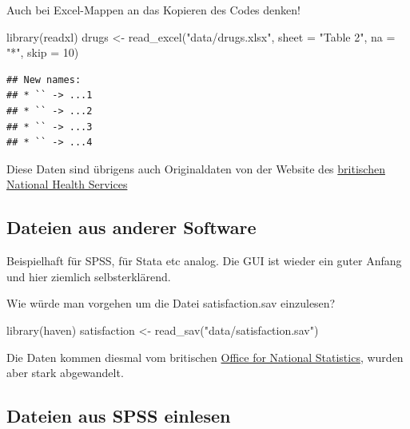 \documentclass[
]{book}
\newenvironment{Shaded}{\begin{snugshade}}{\end{snugshade}}
\newcommand{\AttributeTok}[1]{\textcolor[rgb]{0.77,0.63,0.00}{#1}}
\newcommand{\DecValTok}[1]{\textcolor[rgb]{0.00,0.00,0.81}{#1}}
\newcommand{\FunctionTok}[1]{\textcolor[rgb]{0.00,0.00,0.00}{#1}}
\newcommand{\NormalTok}[1]{#1}
\newcommand{\OtherTok}[1]{\textcolor[rgb]{0.56,0.35,0.01}{#1}}
\newcommand{\StringTok}[1]{\textcolor[rgb]{0.31,0.60,0.02}{#1}}
\begin{document}
Auch bei Excel-Mappen an das Kopieren des Codes denken!

\begin{Shaded}
\begin{Highlighting}[]
\FunctionTok{library}\NormalTok{(readxl)}
\NormalTok{drugs }\OtherTok{\textless{}{-}} \FunctionTok{read\_excel}\NormalTok{(}\StringTok{"data/drugs.xlsx"}\NormalTok{,}
                    \AttributeTok{sheet =} \StringTok{"Table 2"}\NormalTok{, }\AttributeTok{na =} \StringTok{"*"}\NormalTok{, }\AttributeTok{skip =} \DecValTok{10}\NormalTok{)}
\end{Highlighting}
\end{Shaded}

\begin{verbatim}
## New names:
## * `` -> ...1
## * `` -> ...2
## * `` -> ...3
## * `` -> ...4
\end{verbatim}

Diese Daten sind übrigens auch Originaldaten von der Website des \href{https://digital.nhs.uk/data-and-information/publications/statistical/statistics-on-drug-misuse/2018}{britischen National Health Services}

\hypertarget{dateien-aus-anderer-software}{%
\subsection{Dateien aus anderer Software}\label{dateien-aus-anderer-software}}

Beispielhaft für SPSS, für Stata etc analog.
Die GUI ist wieder ein guter Anfang und hier ziemlich selbsterklärend.

Wie würde man vorgehen um die Datei satisfaction.sav einzulesen?

\begin{Shaded}
\begin{Highlighting}[]
\FunctionTok{library}\NormalTok{(haven)}
\NormalTok{satisfaction }\OtherTok{\textless{}{-}} \FunctionTok{read\_sav}\NormalTok{(}\StringTok{"data/satisfaction.sav"}\NormalTok{)}
\end{Highlighting}
\end{Shaded}

Die Daten kommen diesmal vom britischen \href{https://www.ons.gov.uk/peoplepopulationandcommunity/wellbeing/adhocs/007955estimatesofpersonalwellbeingbrokendownbycountryofbirthfromtheukannualpopulationsurveyaps}{Office for National Statistics}, wurden aber stark abgewandelt.

\hypertarget{dateien-aus-spss-einlesen}{%
\subsection{Dateien aus SPSS einlesen}\label{dateien-aus-spss-einlesen}}
\end{document}
